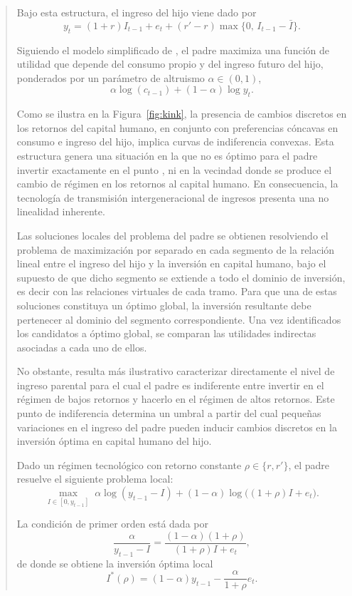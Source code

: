 \documentclass[12pt]{article}
\begin{document}
\begin{abstract}
Bajo esta estructura, el ingreso del hijo viene dado por
\[
y_t = (1+r) I_{t-1} + e_t + (r' - r)\max\{0,\, I_{t-1} - \bar I\}.
\]

Siguiendo el modelo simplificado de \textcite{Solon_1999}, el padre maximiza una función de utilidad que depende del consumo propio y del ingreso futuro del hijo, ponderados por un parámetro de altruismo $\alpha \in (0,1)$,
\[
\alpha \log(c_{t-1}) + (1-\alpha)\log y_t.
\]

Como se ilustra en la Figura~\ref{fig:kink}, la presencia de cambios discretos en los retornos del capital humano, en conjunto con preferencias cóncavas en consumo e ingreso del hijo, implica curvas de indiferencia convexas. Esta estructura genera una situación en la que no es óptimo para el padre invertir exactamente en el punto , ni en la vecindad donde se produce el cambio de régimen en los retornos al capital humano. En consecuencia, la tecnología de transmisión intergeneracional de ingresos presenta una no linealidad inherente.

Las soluciones locales del problema del padre se obtienen resolviendo el problema de maximización por separado en cada segmento de la relación lineal entre el ingreso del hijo y la inversión en capital humano, bajo el supuesto de que dicho segmento se extiende a todo el dominio de inversión, es decir con las relaciones virtuales de cada tramo. Para que una de estas soluciones constituya un óptimo global, la inversión resultante debe pertenecer al dominio del segmento correspondiente. Una vez identificados los candidatos a óptimo global, se comparan las utilidades indirectas asociadas a cada uno de ellos.

No obstante, resulta más ilustrativo caracterizar directamente el nivel de ingreso parental para el cual el padre es indiferente entre invertir en el régimen de bajos retornos y hacerlo en el régimen de altos retornos. Este punto de indiferencia determina un umbral a partir del cual pequeñas variaciones en el ingreso del padre pueden inducir cambios discretos en la inversión óptima en capital humano del hijo.


Dado un régimen tecnológico con retorno constante $\rho\in\{r,r'\}$, el padre resuelve el siguiente problema local:
\[
\max_{I\in[0,y_{t-1}]}
\;
\alpha \log(y_{t-1}-I)
+
(1-\alpha)\log\big((1+\rho)I+e_t\big).
\]

La condición de primer orden está dada por
\[
\frac{\alpha}{y_{t-1}-I}
=
\frac{(1-\alpha)(1+\rho)}{(1+\rho)I+e_t},
\]
de donde se obtiene la inversión óptima local
\[
I^*(\rho)
=
(1-\alpha)y_{t-1}
-
\frac{\alpha}{1+\rho}e_t.
\]


\end{abstract}
\end{document}
